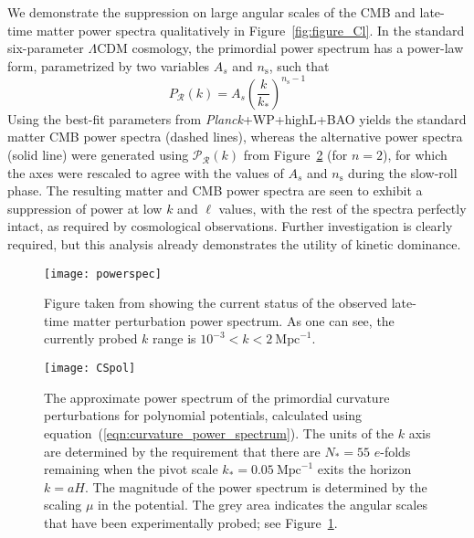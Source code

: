 We demonstrate the suppression on large angular scales of the CMB and late-time matter power spectra qualitatively in Figure~\ref{fig:figure_Cl}.  In the standard six-parameter $\Lambda$CDM cosmology, the primordial power spectrum has a power-law form, parametrized by two variables $A_s$ and $n_\mathrm{s}$, such that
%
\begin{equation}
	P_\mathcal{R}(k) = A_s\left(\frac{k}{k_*}\right)^{n_\mathrm{s}-1}
\end{equation}
%
Using the best-fit parameters from {\em Planck}+WP+highL+BAO \citep{planck_collaboration_planck_2013} yields the standard matter CMB power spectra (dashed lines), whereas the alternative power spectra (solid line) were generated using $\mathcal{P}_\mathcal{R}(k)$ from Figure~\ref{fig:figure_CSpol} (for $n=2$), for which the axes were rescaled to agree with the values of $A_s$ and $n_\mathrm{s}$ during the slow-roll phase. The resulting matter and CMB power spectra are seen to exhibit a suppression of power at low $k$ and $\ell$ values, with the rest of the spectra perfectly intact, as required by cosmological observations.  Further investigation is clearly required, but this analysis already demonstrates the utility of kinetic dominance.

%
\begin{figure}
  \centering
  \texttt{[image: powerspec]}
  \caption{Figure taken from \protect\citet{hlozek_atacama_2012} showing the current status of the observed late-time matter perturbation power spectrum. As one can see, the currently probed $k$ range is $10^{-3}<k<2\:\mathrm{Mpc}^{-1}$.  }
  \label{fig:experimental_power_spectrum}
\end{figure}
%

%
\begin{figure}
  \texttt{[image: CSpol]}
  \caption{The approximate power spectrum of the primordial curvature perturbations for polynomial potentials, calculated using equation~\protect(\ref{eqn:curvature_power_spectrum}). The units of the $k$ axis are determined by the requirement that there are $N_*=55$ $e$-folds remaining when the pivot scale $k_*=0.05\:\mathrm{Mpc}^{-1}$ exits the horizon $k=aH$. The magnitude of the power spectrum is determined by the scaling $\mu$ in the potential. The grey area indicates the angular scales that have been experimentally probed; see Figure~\protect\ref{fig:experimental_power_spectrum}.  }
  \label{fig:figure_CSpol}
\end{figure}
%

